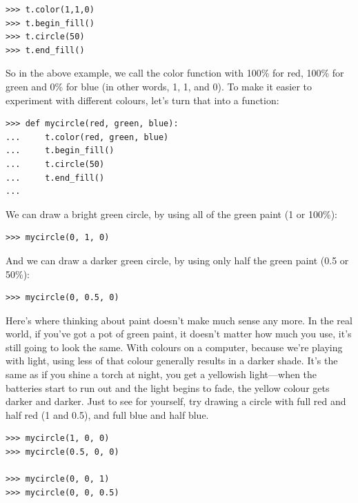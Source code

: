 \begin{listing}
\begin{verbatim}
>>> t.color(1,1,0)
>>> t.begin_fill()
>>> t.circle(50)
>>> t.end_fill()
\end{verbatim}
\end{listing}

So in the above example, we call the color function with 100\% for red, 100\% for green and 0\% for blue (in other words, 1, 1, and 0).  To make it easier to experiment with different colours, let's turn that into a function:

\begin{listing}
\begin{verbatim}
>>> def mycircle(red, green, blue):
...     t.color(red, green, blue)
...     t.begin_fill()
...     t.circle(50)
...     t.end_fill()
...
\end{verbatim}
\end{listing}

\noindent
We can draw a bright green circle, by using all of the green paint (1 or 100\%):

\begin{listing}
\begin{verbatim}
>>> mycircle(0, 1, 0)
\end{verbatim}
\end{listing}

\noindent
And we can draw a darker green circle, by using only half the green paint (0.5 or 50\%):

\begin{listing}
\begin{verbatim}
>>> mycircle(0, 0.5, 0)
\end{verbatim}
\end{listing}

Here's where thinking about paint doesn't make much sense any more.  In the real world, if you've got a pot of green paint, it doesn't matter how much you use, it's still going to look the same.  With colours on a computer, because we're playing with light, using less of that colour generally results in a darker shade.  It's the same as if you shine a torch at night, you get a yellowish light---when the batteries start to run out and the light begins to fade, the yellow colour gets darker and darker.  Just to see for yourself, try drawing a circle with full red and half red (1 and 0.5), and full blue and half blue.

\begin{listing}
\begin{verbatim}
>>> mycircle(1, 0, 0)
>>> mycircle(0.5, 0, 0)

>>> mycircle(0, 0, 1)
>>> mycircle(0, 0, 0.5)
\end{verbatim}
\end{listing}

